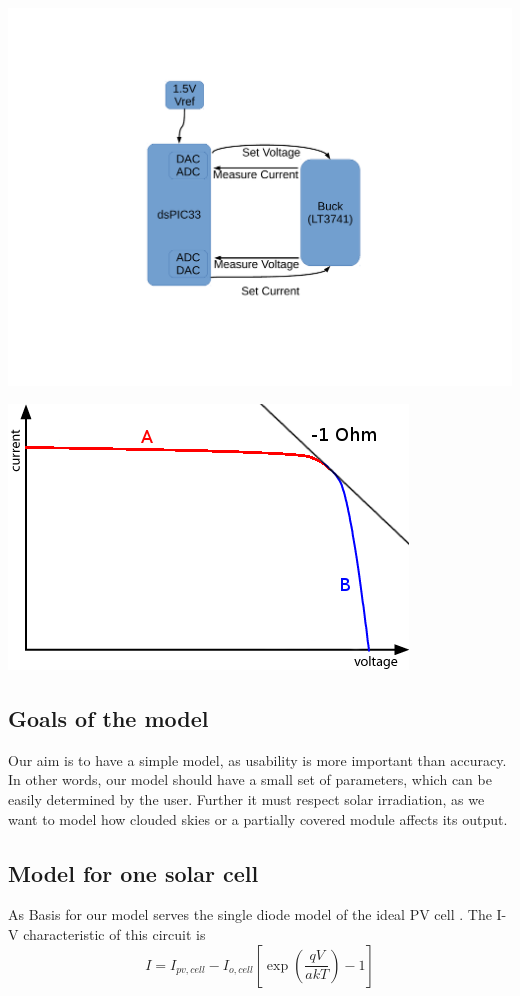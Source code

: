 \begin{minipage}{0.5\textwidth}
    \center
    \includegraphics[width=\textwidth,trim=140 140 120 100,clip]{images/block-diag-control.pdf}
    \label{fig:diag:block}
\end{minipage}
\begin{minipage}{0.5\textwidth}
    \center
    \includegraphics[width=\textwidth]{images/vi-curve.png}
    \label{fig:circuit:buck:uset}
\end{minipage}


\subsection{Goals of the model}
Our aim is to have a simple model, as usability is more important than accuracy. In other words, our model should have a small set of parameters, which can be easily determined by the user. Further it must respect solar irradiation, as we want to model how clouded skies or a partially covered module affects its output.

\subsection{Model for one solar cell}
As Basis for our model serves the single diode model of the ideal PV cell . The I-V characteristic of this circuit is
\begin{equation}
 I = I_{pv,cell} - I_{o,cell} \left[ \exp \left( \frac{qV}{akT} \right) - 1 \right]
 \end{equation}

